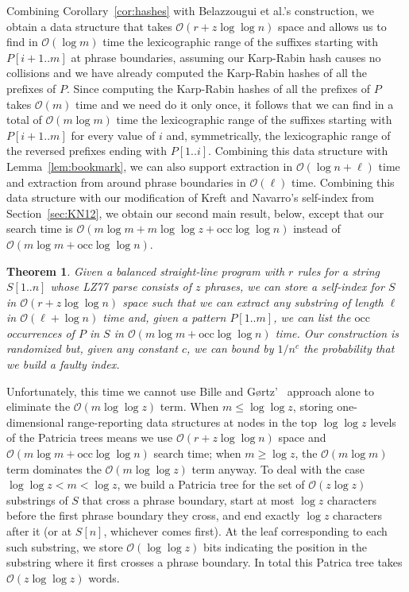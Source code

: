 \documentclass[review]{elsarticle}
\newtheorem{theorem}{Theorem}
\newcommand{\Oh}[1]
    {\ensuremath{\mathcal{O}\!\left( {#1} \right)}}
\newcommand{\occ}
    {\ensuremath{\mathrm{occ}}}
\begin{document}
Combining Corollary~\ref{cor:hashes} with Belazzougui et al.'s construction, we obtain a data structure that takes $\Oh{r + z \log \log n}$ space and allows us to find in $\Oh{\log m}$ time the lexicographic range of the suffixes starting with \(P [i + 1..m]\) at phrase boundaries, assuming our Karp-Rabin hash causes no collisions and we have already computed the Karp-Rabin hashes of all the prefixes of $P$.  Since computing the Karp-Rabin hashes of all the prefixes of $P$ takes $\Oh{m}$ time and we need do it only once, it follows that we can find in a total of $\Oh{m \log m}$ time the lexicographic range of the suffixes starting with \(P [i + 1..m]\) for every value of $i$ and, symmetrically, the lexicographic range of the reversed prefixes ending with \(P [1..i]\).  Combining this data structure with Lemma~\ref{lem:bookmark}, we can also support extraction in $\Oh{\log n + \ell}$ time and extraction from around phrase boundaries in $\Oh{\ell}$ time.  Combining this data structure with our modification of Kreft and Navarro's self-index from Section~\ref{sec:KN12}, we obtain our second main result, below, except that our search time is $\Oh{m \log m + m \log \log z + \occ \log \log n}$ instead of $\Oh{m \log m + \occ \log \log n}$.

\begin{theorem} \label{thm:balanced}
Given a balanced straight-line program with $r$ rules for a string \(S [1..n]\) whose LZ77 parse consists of $z$ phrases, we can store a self-index for $S$ in $\Oh{r + z \log \log n}$ space such that we can extract any substring of length $\ell$ in $\Oh{\ell + \log n}$ time and, given a pattern \(P [1..m]\), we can list the $\occ$ occurrences of $P$ in $S$ in $\Oh{m \log m + \occ \log \log n}$ time.  Our construction is randomized but, given any constant $c$, we can bound by \(1 / n^c\) the probability that we build a faulty index.
\end{theorem}

Unfortunately, this time we cannot use Bille and G{\o}rtz'~\cite{BG11} approach alone to eliminate the $\Oh{m \log \log z}$ term.  When \(m \leq \log \log z\), storing one-dimensional range-reporting data structures at nodes in the top \(\log \log z\) levels of the Patricia trees means we use $\Oh{r + z \log \log n}$ space and $\Oh{m \log m + \occ \log \log n}$ search time; when \(m \geq \log z\), the $\Oh{m \log m}$ term dominates the $\Oh{m \log \log z}$ term anyway. To deal with the case \(\log \log z < m < \log z\), we build a Patricia tree for the set of $\Oh{z \log z}$ substrings of $S$ that cross a phrase boundary, start at most \(\log z\) characters before the first phrase boundary they cross, and end exactly \(\log z\) characters after it (or at \(S [n]\), whichever comes first).  At the leaf corresponding to each such substring, we store $\Oh{\log \log z}$ bits indicating the position in the substring where it first crosses a phrase boundary.  In total this Patrica tree takes $\Oh{z \log \log z}$ words.
\end{document}
